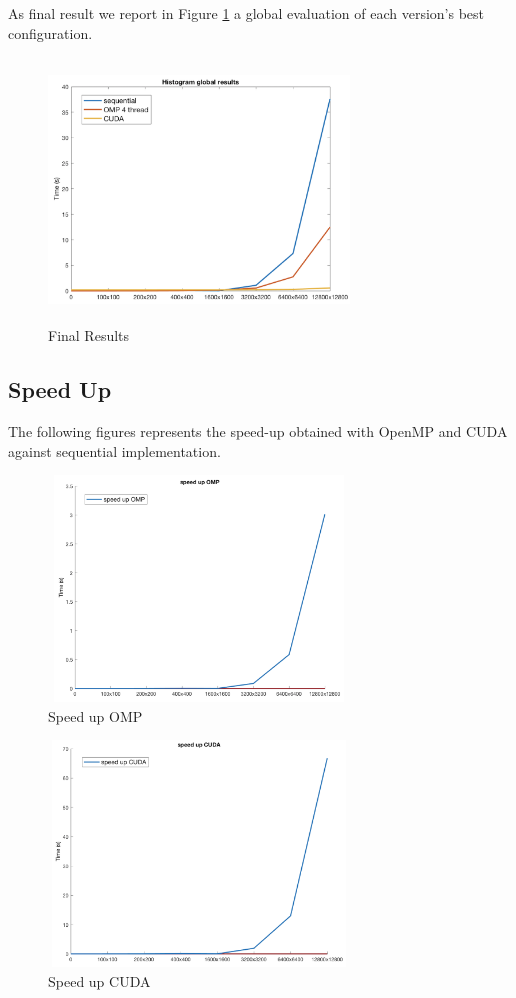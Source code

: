 \documentclass[10pt,twocolumn,letterpaper]{article}
\begin{document}
As final result we report in Figure \ref{fig:global}  a global evaluation of each version's best configuration.
\begin{figure}[h]
	\centering
	\includegraphics[width=8cm, height=7cm]{res_global}
	\caption{Final Results}
	\label{fig:global}
\end{figure}


\subsection{Speed Up}
The following figures represents the speed-up obtained with OpenMP and CUDA against sequential implementation.
\begin{figure}[h]
	\centering
	\includegraphics[width=8cm, height=6cm]{speed_up_OMP}
	\caption{Speed up OMP}
	\label{fig:s-u-omp}
\end{figure}

\begin{figure}[h]
	\centering
	\includegraphics[width=8cm, height=6cm]{speed_up_CUDA}
	\caption{Speed up CUDA}
	\label{fig:s-u-CUDA}
\end{figure}
\end{document}
